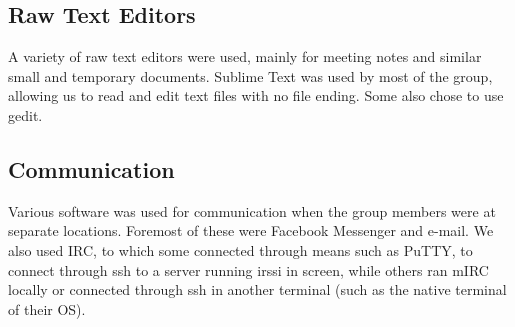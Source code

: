 \subsection{Raw Text Editors}
A variety of raw text editors were used, mainly for meeting notes and similar small and temporary documents. Sublime Text was used by most of the group, allowing us to read and edit text files with no file ending. Some also chose to use gedit.

\subsection{Communication}
Various software was used for communication when the group members were at separate locations. Foremost of these were Facebook Messenger and e-mail. We also used IRC, to which some connected through means such as PuTTY, to connect through ssh to a server running irssi in screen, while others ran mIRC locally or connected through ssh in another terminal (such as the native terminal of their OS).
